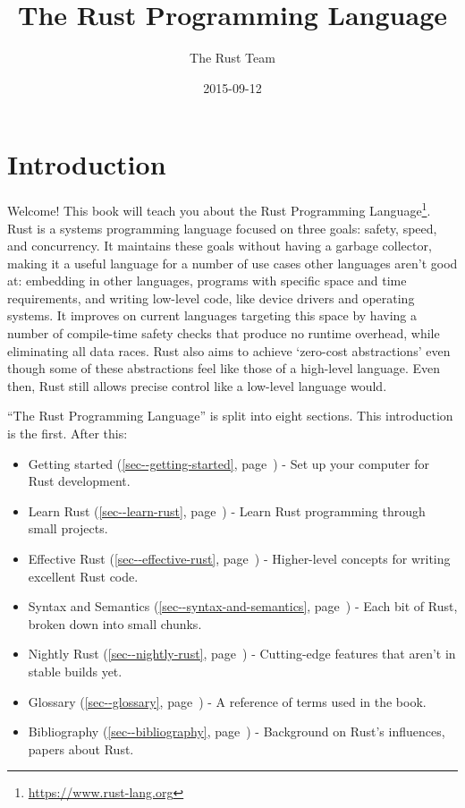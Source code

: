 \documentclass[a4paper,]{book}
\title{The Rust Programming Language}
\author{The Rust Team}
\date{2015-09-12}
\renewcommand*{\hyperref}[2][\ar]{%
  \def\ar{#2}%
  #2 (\autoref{#1}, page~\pageref{#1})}
\renewcommand{\href}[2]{#2\footnote{\url{#1}}}
\providecommand{\tightlist}{%
  \setlength{\itemsep}{0pt}\setlength{\parskip}{0pt}}
\begin{document}
  \maketitle



{
  \hypersetup{linkcolor=black}
  \setcounter{tocdepth}{2}
  \tableofcontents
  \newpage
}

\chapter{Introduction}\label{introduction}

Welcome! This book will teach you about the
\href{https://www.rust-lang.org}{Rust Programming Language}. Rust is a
systems programming language focused on three goals: safety, speed, and
concurrency. It maintains these goals without having a garbage
collector, making it a useful language for a number of use cases other
languages aren't good at: embedding in other languages, programs with
specific space and time requirements, and writing low-level code, like
device drivers and operating systems. It improves on current languages
targeting this space by having a number of compile-time safety checks
that produce no runtime overhead, while eliminating all data races. Rust
also aims to achieve `zero-cost abstractions' even though some of these
abstractions feel like those of a high-level language. Even then, Rust
still allows precise control like a low-level language would.

``The Rust Programming Language'' is split into eight sections. This
introduction is the first. After this:

\begin{itemize}
\tightlist
\item
  \hyperref[sec--getting-started]{Getting started} - Set up your
  computer for Rust development.
\item
  \hyperref[sec--learn-rust]{Learn Rust} - Learn Rust programming
  through small projects.
\item
  \hyperref[sec--effective-rust]{Effective Rust} - Higher-level concepts
  for writing excellent Rust code.
\item
  \hyperref[sec--syntax-and-semantics]{Syntax and Semantics} - Each bit
  of Rust, broken down into small chunks.
\item
  \hyperref[sec--nightly-rust]{Nightly Rust} - Cutting-edge features
  that aren't in stable builds yet.
\item
  \hyperref[sec--glossary]{Glossary} - A reference of terms used in the
  book.
\item
  \hyperref[sec--bibliography]{Bibliography} - Background on Rust's
  influences, papers about Rust.
\end{itemize}
\end{document}
